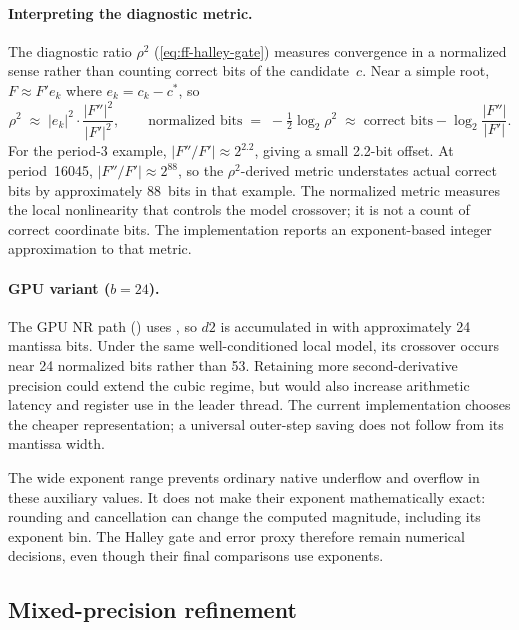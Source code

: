 \paragraph{Interpreting the diagnostic metric.}
The diagnostic ratio $\rho^2$ (\cref{eq:ff-halley-gate}) measures
convergence in a normalized sense rather than counting correct bits of
the candidate~$c$.  Near a simple root, $F \approx F' e_k$ where
$e_k = c_k - c^*$, so
\begin{equation}\label{eq:ff-rho2-offset}
\rho^2 \;\approx\; |e_k|^2 \cdot \frac{|F''|^2}{|F'|^2},
\qquad
  \text{normalized bits}
  \;=\; -\tfrac{1}{2}\log_2 \rho^2
  \;\approx\; \text{correct bits} - \log_2 \frac{|F''|}{|F'|}.
\end{equation}
For the period-3 example, $|F''/F'| \approx 2^{2.2}$, giving a small
2.2-bit offset.  At period~16045, $|F''/F'| \approx 2^{88}$, so the
$\rho^2$-derived metric understates actual correct bits by approximately
88~bits in that example.  The normalized metric measures the local
nonlinearity that controls the model crossover; it is not a count of correct
coordinate bits.  The implementation reports an exponent-based integer
approximation to that metric.

\paragraph{GPU variant ($b = 24$).}
The GPU NR path () uses ,
so $d2$ is accumulated in  with approximately
24 mantissa bits.  Under the same well-conditioned local model, its crossover
occurs near 24 normalized bits rather than 53.  Retaining more second-derivative
precision could extend the cubic regime, but would also increase arithmetic
latency and register use in the leader thread.  The current implementation
chooses the cheaper representation; a universal outer-step saving does not
follow from its mantissa width.

The wide exponent range prevents ordinary native underflow and overflow in
these auxiliary values.  It does not make their exponent mathematically exact:
rounding and cancellation can change the computed magnitude, including its
exponent bin.  The Halley gate and error proxy therefore remain numerical
decisions, even though their final comparisons use exponents.

\subsection{Mixed-precision refinement}
\label{subsec:ff-mixed-prec}

